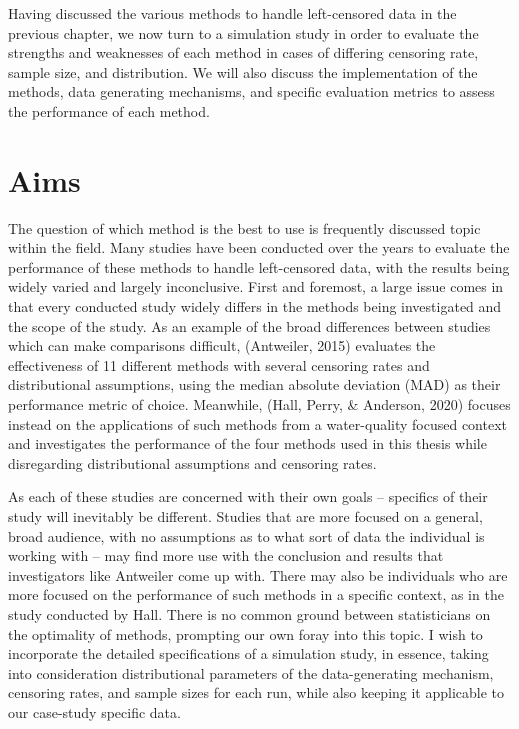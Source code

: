\documentclass[12pt, twoside]{amherstthesis}
\begin{document}
Having discussed the various methods to handle left-censored data in the previous chapter, we now turn to a simulation study in order to evaluate the strengths and weaknesses of each method in cases of differing censoring rate, sample size, and distribution. We will also discuss the implementation of the methods, data generating mechanisms, and specific evaluation metrics to assess the performance of each method.

\hypertarget{aims}{%
\section{Aims}\label{aims}}

The question of which method is the best to use is frequently discussed topic within the field. Many studies have been conducted over the years to evaluate the performance of these methods to handle left-censored data, with the results being widely varied and largely inconclusive. First and foremost, a large issue comes in that every conducted study widely differs in the methods being investigated and the scope of the study. As an example of the broad differences between studies which can make comparisons difficult, (Antweiler, 2015) evaluates the effectiveness of 11 different methods with several censoring rates and distributional assumptions, using the median absolute deviation (MAD) as their performance metric of choice. Meanwhile, (Hall, Perry, \& Anderson, 2020) focuses instead on the applications of such methods from a water-quality focused context and investigates the performance of the four methods used in this thesis while disregarding distributional assumptions and censoring rates.

As each of these studies are concerned with their own goals -- specifics of their study will inevitably be different. Studies that are more focused on a general, broad audience, with no assumptions as to what sort of data the individual is working with -- may find more use with the conclusion and results that investigators like Antweiler come up with. There may also be individuals who are more focused on the performance of such methods in a specific context, as in the study conducted by Hall. There is no common ground between statisticians on the optimality of methods, prompting our own foray into this topic. I wish to incorporate the detailed specifications of a simulation study, in essence, taking into consideration distributional parameters of the data-generating mechanism, censoring rates, and sample sizes for each run, while also keeping it applicable to our case-study specific data.
\end{document}
